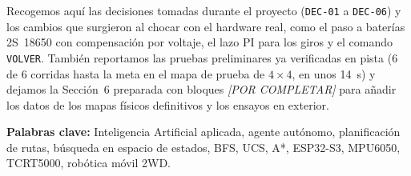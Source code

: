 Recogemos aquí las decisiones tomadas durante el proyecto (\texttt{DEC-01} a \texttt{DEC-06}) y los cambios que surgieron al chocar con el hardware real, como el paso a baterías 2S~18650 con compensación por voltaje, el lazo PI para los giros y el comando \texttt{VOLVER}. También reportamos las pruebas preliminares ya verificadas en pista (6 de 6 corridas hasta la meta en el mapa de prueba de $4\times 4$, en unos \SI{14}{\second}) y dejamos la Sección~6 preparada con bloques \emph{[POR COMPLETAR]} para añadir los datos de los mapas físicos definitivos y los ensayos en exterior.

\vspace{0.6cm}
\noindent\textbf{Palabras clave:} Inteligencia Artificial aplicada, agente autónomo, planificación de rutas, búsqueda en espacio de estados, BFS, UCS, A*, ESP32-S3, MPU6050, TCRT5000, robótica móvil 2WD.
